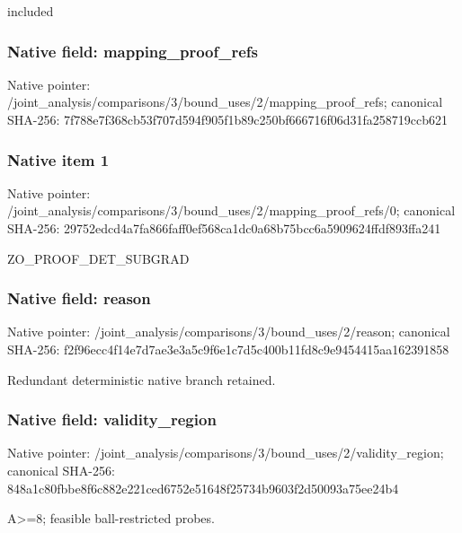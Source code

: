 \documentclass[10pt,a4paper]{article}
\begin{document}
\begingroup\raggedright\sloppy included\par\endgroup

\subsubsection{Native field: mapping\_\allowbreak{}proof\_\allowbreak{}refs}
Native pointer: /joint\_\allowbreak{}analysis/comparisons/3/bound\_\allowbreak{}uses/2/mapping\_\allowbreak{}proof\_\allowbreak{}refs; canonical SHA-256: 7f788e7f368cb53f707d594f905f1b89c250bf666716f06d31fa258719ccb621

\subsubsection{Native item 1}
Native pointer: /joint\_\allowbreak{}analysis/comparisons/3/bound\_\allowbreak{}uses/2/mapping\_\allowbreak{}proof\_\allowbreak{}refs/0; canonical SHA-256: 29752edcd4a7fa866faff0ef568ca1dc0a68b75bcc6a5909624ffdf893ffa241

\begingroup\raggedright\sloppy ZO\_\allowbreak{}PROOF\_\allowbreak{}DET\_\allowbreak{}SUBGRAD\par\endgroup

\subsubsection{Native field: reason}
Native pointer: /joint\_\allowbreak{}analysis/comparisons/3/bound\_\allowbreak{}uses/2/reason; canonical SHA-256: f2f96ecc4f14e7d7ae3e3a5c9f6e1c7d5c400b11fd8c9e9454415aa162391858

\begingroup\raggedright\sloppy Redundant deterministic native branch retained.\par\endgroup

\subsubsection{Native field: validity\_\allowbreak{}region}
Native pointer: /joint\_\allowbreak{}analysis/comparisons/3/bound\_\allowbreak{}uses/2/validity\_\allowbreak{}region; canonical SHA-256: 848a1c80fbbe8f6c882e221ced6752e51648f25734b9603f2d50093a75ee24b4

\begingroup\raggedright\sloppy A>=\allowbreak{}8;\allowbreak{} feasible ball-restricted probes.\par\endgroup
\end{document}
